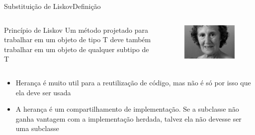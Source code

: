 \documentclass[10pt]{beamer}
\begin{document}

\begin{frame}{Substituição de Liskov}{Definição}
  \begin{columns}[T]

    \begin{column}{.7\textwidth}
      \begin{block}{Princípio de Liskov}
      Um método projetado para trabalhar em um objeto de tipo T deve também trabalhar em um objeto de qualquer subtipo de T
      \end{block}
    \end{column}

    \hfill
    \begin{column}{.3\textwidth}
      \begin{figure}
        \includegraphics[width=1\textwidth]{images/Liskov.jpg}
      \end{figure}
    \end{column}
  \end{columns}

      \begin{itemize}
    	\item Herança é muito util para a reutilização de código, mas não é só por isso que ela deve ser usada
        \item A herança é um compartilhamento de implementação. Se a subclasse não ganha vantagem com a implementação herdada, talvez ela não devesse ser uma subclasse
  	\end{itemize}

\end{frame}
\end{document}
